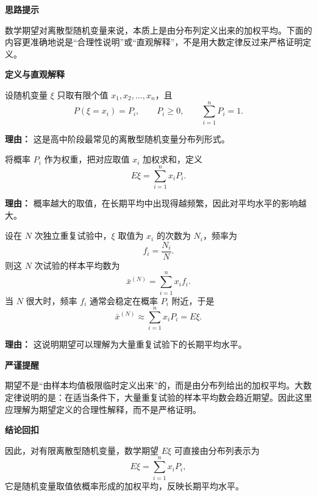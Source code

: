 \begin{proofbox}
	\textbf{\textcolor{CProof}{思路提示}}

	数学期望对离散型随机变量来说，本质上是由分布列定义出来的加权平均。下面的内容更准确地说是“合理性说明”或“直观解释”，不是用大数定律反过来严格证明定义。

	\medskip
	\textbf{\textcolor{CProof}{定义与直观解释}}
	\begin{description}[style=nextline, leftmargin=2.8em, labelsep=0.5em, itemsep=0.55em]
		\item[\textbf{步骤一（有限分布列）：}] 设随机变量 $\xi$ 只取有限个值 $x_1,x_2,\dots,x_n$，且
		      \[
			      P(\xi=x_i)=P_i,\qquad P_i\ge0,\qquad \sum_{i=1}^{n}P_i=1.
		      \]
		      \par\textbf{理由：} 这是高中阶段最常见的离散型随机变量分布列形式。

		\item[\textbf{步骤二（加权平均定义）：}] 将概率 $P_i$ 作为权重，把对应取值 $x_i$ 加权求和，定义
		      \[
			      E\xi=\sum_{i=1}^{n}x_iP_i.
		      \]
		      \par\textbf{理由：} 概率越大的取值，在长期平均中出现得越频繁，因此对平均水平的影响越大。

		\item[\textbf{步骤三（频率直观）：}] 设在 $N$ 次独立重复试验中，$\xi$ 取值为 $x_i$ 的次数为 $N_i$，频率为
		      \[
			      f_i=\frac{N_i}{N}.
		      \]
		      则这 $N$ 次试验的样本平均数为
		      \[
			      \bar{x}^{(N)}=\sum_{i=1}^{n}x_i f_i.
		      \]
		      当 $N$ 很大时，频率 $f_i$ 通常会稳定在概率 $P_i$ 附近，于是
		      \[
			      \bar{x}^{(N)}\approx \sum_{i=1}^{n}x_iP_i=E\xi.
		      \]
		      \par\textbf{理由：} 这说明期望可以理解为大量重复试验下的长期平均水平。
	\end{description}

	\medskip
	\textbf{\textcolor{CProof}{严谨提醒}}

	期望不是“由样本均值极限临时定义出来”的，而是由分布列给出的加权平均。大数定律说明的是：在适当条件下，大量重复试验的样本平均数会趋近期望。因此这里应理解为期望定义的合理性解释，而不是严格证明。

	\medskip
	\textbf{\textcolor{CProof}{结论回扣}}

	因此，对有限离散型随机变量，数学期望 $E\xi$ 可直接由分布列表示为
	\[
		E\xi=\sum_{i=1}^{n}x_iP_i,
	\]
	它是随机变量取值依概率形成的加权平均，反映长期平均水平。
\end{proofbox}